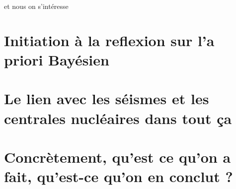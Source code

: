 \documentclass[a4paper]{book}
\renewcommand{\familydefault}{\sfdefault}
\begin{document}
et nous on s'intéresse 



\section*{Initiation à la reflexion sur l'a priori Bayésien}




\section*{Le lien avec les séismes et les centrales nucléaires dans tout ça}



\section*{Concrètement, qu'est ce qu'on a fait, qu'est-ce qu'on en conclut ?}



 

\printbibliography[heading=chapter,title=Bibliography]

\fancyhead{}
\newpage
\pagestyle{empty}
\backmatter
\ \cleardoublepage
\ \newpage
\renewcommand{\familydefault}{\sfdefault}
%
%
%
%
%
\end{document}
